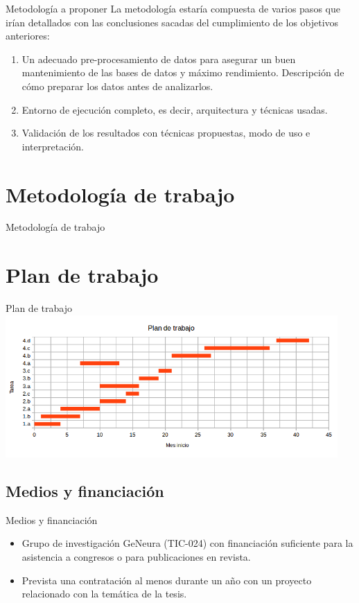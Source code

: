 \documentclass{beamer}
\begin{document}
\begin{frame}{Metodología a proponer}
La metodología estaría compuesta de varios pasos que irían detallados con las conclusiones sacadas del cumplimiento de los objetivos anteriores:

\begin{enumerate}
  \item<1-> Un adecuado pre-procesamiento de datos para asegurar un buen mantenimiento de las bases de datos y máximo rendimiento. Descripción de cómo preparar los datos antes de analizarlos.
  \item<2-> Entorno de ejecución completo, es decir, arquitectura y técnicas usadas.
  \item<3-> Validación de los resultados con técnicas propuestas, modo de uso e interpretación.
\end{enumerate}

\end{frame}

\section{Metodología de trabajo}

\begin{frame}{Metodología de trabajo}

\end{frame}

\section{Plan de trabajo}

\begin{frame}{Plan de trabajo}
\includegraphics[width=0.95\textwidth]{./imgs/especiedegantt.png}
\end{frame}

\subsection{Medios y financiación}

\begin{frame}{Medios y financiación}

\begin{itemize}
  \item Grupo de investigación GeNeura (TIC-024) con financiación suficiente para la asistencia a congresos o para publicaciones en revista.
  \item Prevista una contratación al menos durante un año con un proyecto relacionado con la temática de la tesis.
\end{itemize}

\end{frame}
\end{document}
